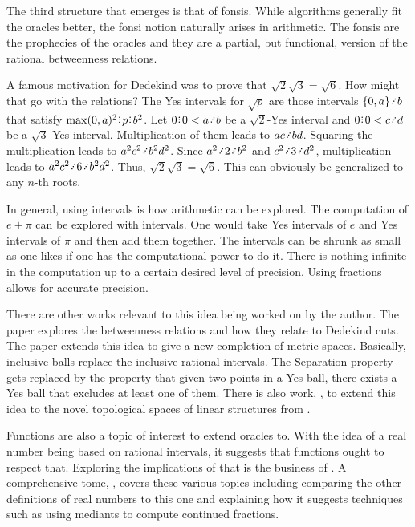 \documentclass[12pt]{article}
\begin{document}
The third structure that emerges is that of fonsis. While algorithms generally fit the oracles better, the fonsi notion naturally arises in arithmetic. The fonsis are the prophecies of the oracles and they are a partial, but functional, version of the rational betweenness relations. 

A famous motivation for Dedekind was to prove that $\sqrt{2} \sqrt{3} = \sqrt{6}$. How might that go with the relations? The Yes intervals for $\sqrt{p}$ are those intervals $\{0, a\} \lte b$ that satisfy $\max(0,a)^2 \rint  p \rint  b^2$. Let $0\rint 0 < a \lte b$ be a $\sqrt{2}$-Yes interval and $0\rint 0 < c\lte d$ be a $\sqrt{3}$-Yes interval. Multiplication of them leads to $ac \lte bd$. Squaring the multiplication leads to $a^2 c^2 \lte b^2 d^2$. Since $a^2 \lte 2 \lte b^2$ and $c^2 \lte 3 \lte d^2$, multiplication leads to $a^2 c^2 \lte 6 \lte b^2 d^2$. Thus, $\sqrt{2} \sqrt{3} = \sqrt{6}$. This can obviously be generalized to any $n$-th roots. 

In general, using intervals is how arithmetic can be explored. The computation of $e + \pi$ can be explored with intervals. One would take Yes intervals of $e$ and Yes intervals of $\pi$ and then add them together. The intervals can be shrunk as small as one likes if one has the computational power to do it. There is nothing infinite in the computation up to a certain desired level of precision. Using fractions allows for accurate precision. 

There are other works relevant to this idea being worked on by the author. The paper \cite{taylor24dedekind} explores the betweenness relations and how they relate to Dedekind cuts. The paper \cite{taylor23metric} extends this idea to give a new completion of metric spaces. Basically, inclusive balls replace the inclusive rational intervals. The Separation property gets replaced by the property that given two points in a Yes ball, there exists a Yes ball that excludes at least one of them. There is also work, \cite{taylor23maudlin}, to extend this idea to the novel topological spaces of linear structures from \cite{maudlin}. 

Functions are also a topic of interest to extend oracles to. With the idea of a real number being based on rational intervals, it suggests that functions ought to respect that. Exploring the implications of that is the business of \cite{taylor23funora}. A comprehensive tome, \cite{taylor23main}, covers these various topics including comparing the other definitions of real numbers to this one and explaining how it suggests techniques such as using mediants to compute continued fractions. 

\medskip

\normalem %


\printbibliography
\end{document}
